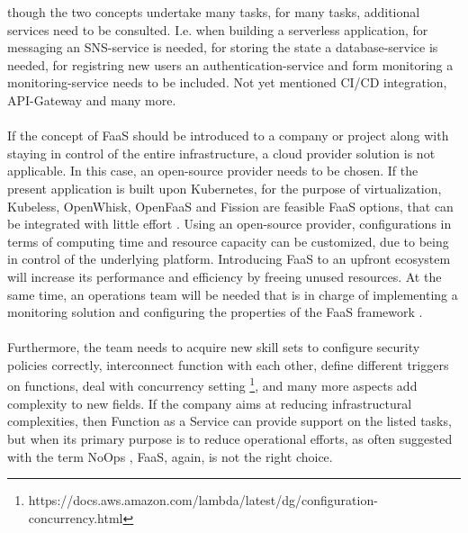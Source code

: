 \documentclass[a4paper,twoside,11pt, pagesize]{scrartcl}
\begin{document}
\begin{spacing}{1.2}
though the two concepts undertake many tasks, for many tasks, additional services need to be consulted. I.e. when building a serverless application, for messaging an SNS-service is needed, for storing the state a database-service is needed, for registring new users an authentication-service and form monitoring a monitoring-service needs to be included. Not yet mentioned CI/CD integration, API-Gateway and many more.\\\\ If the concept of FaaS should be introduced to a company or project along with staying in control of the entire infrastructure, a cloud provider solution is not applicable. In this case, an open-source provider needs to be chosen. If the present application is built upon Kubernetes, for the purpose of virtualization, Kubeless, OpenWhisk, OpenFaaS and Fission are feasible FaaS options, that can be integrated with little effort \cite{palade2019evaluation}. Using an open-source provider, configurations in terms of computing time and resource capacity can be customized, due to being in control of the underlying platform. Introducing FaaS to an upfront ecosystem will increase its performance and efficiency by freeing unused resources. At the same time, an operations team will be needed that is in charge of implementing a monitoring solution and configuring the properties of the FaaS framework \cite{mohanty2018evaluation}.\\\\ Furthermore, the team needs to acquire new skill sets to configure security policies correctly, interconnect function with each other, define different triggers on functions, deal with concurrency setting \footnote{https://docs.aws.amazon.com/lambda/latest/dg/configuration-concurrency.html}, and many more aspects add complexity to new fields. If the company aims at reducing infrastructural complexities, then Function as a Service can provide support on the listed tasks, but when its primary purpose is to reduce operational efforts, as often suggested with the term \glqq NoOps\grqq{} \cite{eivy2017wary}, FaaS, again, is not the right choice.

\end{spacing}
\end{document}
